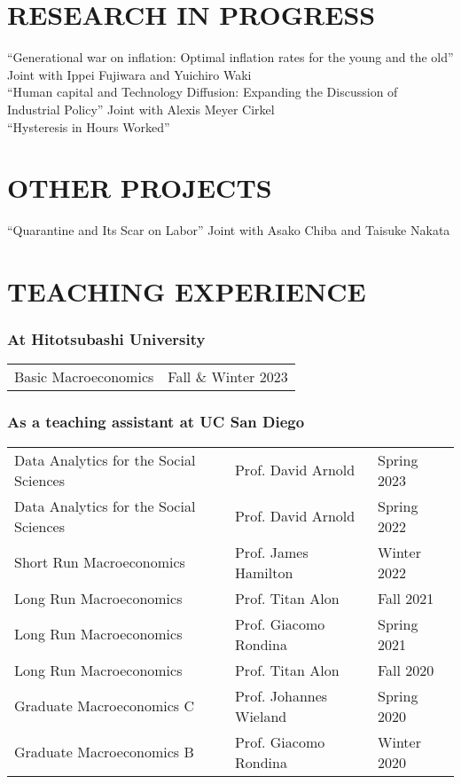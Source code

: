 \documentclass[12pt]{article}
\begin{document}
\section*{RESEARCH IN PROGRESS}
``Generational war on inflation: Optimal inflation rates for the young and the old'' Joint with Ippei Fujiwara and Yuichiro Waki\\
``Human capital and Technology Diffusion: Expanding the Discussion of Industrial Policy'' Joint with Alexis Meyer Cirkel\\
``Hysteresis in Hours Worked''

\section*{OTHER PROJECTS}
``Quarantine and Its Scar on Labor'' Joint with Asako Chiba and Taisuke Nakata

\section*{TEACHING EXPERIENCE}
\subsubsection*{At Hitotsubashi University}
\begin{tabular}{@{}ll}
Basic Macroeconomics&Fall \& Winter 2023
\end{tabular}

\subsubsection*{As a teaching assistant at UC San Diego}
\begin{tabular}{@{}lll}
Data Analytics for the Social Sciences&Prof. David Arnold&Spring 2023\\
Data Analytics for the Social Sciences&Prof. David Arnold&Spring 2022\\
Short Run Macroeconomics&Prof. James Hamilton&Winter 2022\\
Long Run Macroeconomics&Prof. Titan Alon&Fall 2021\\
Long Run Macroeconomics&Prof. Giacomo Rondina&Spring 2021\\
Long Run Macroeconomics&Prof. Titan Alon&Fall 2020\\
Graduate Macroeconomics C&Prof. Johannes Wieland&Spring 2020\\
Graduate Macroeconomics B&Prof. Giacomo Rondina&Winter 2020
\end{tabular}
\end{document}
